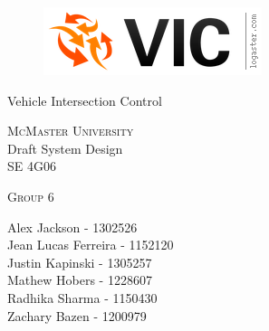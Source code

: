 \documentclass [10pt]{article}
\begin{document}
\begin {center} 

\thispagestyle{empty}
\vspace*{5cm}

\begin {figure}[h!]
\centering
\hspace{-10mm}\includegraphics [scale = .5, trim={.4cm 0 .8cm 0},clip] {figures/vic_logo.png}
\end {figure}

{\fontfamily{\cabinfamily}\selectfont
\Huge{Vehicle Intersection Control} }

\vspace{1 cm}
{\Large{\textsc{McMaster University}}\\}  \vspace {1cm}
{\large Draft System Design\\ \vspace {0.4 cm} SE 4G06}  \vspace {1cm}

{\large \textsc{Group 6} \\} \vspace{1cm}

{
Alex Jackson - 1302526\\
Jean Lucas Ferreira - 1152120 \\
Justin Kapinski - 1305257\\
Mathew Hobers - 1228607\\
Radhika Sharma - 1150430\\
Zachary Bazen - 1200979}




\end{center}


\pagebreak


\tableofcontents
\listoftables
\listoffigures



\pagebreak


\thispagestyle{empty}
\end{document}
